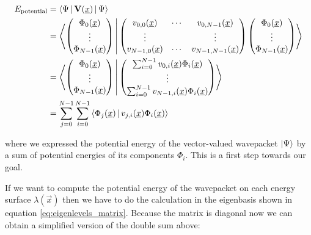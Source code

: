 \begin{align*}
  E_{\text{potential}}
  & = \Braket{\Psi | \mathbf{V}(\underline{x}) | \Psi} \\
  & = \Braket{
    \begin{pmatrix}
      \Phi_0(\underline{x}) \\
      \vdots \\
      \Phi_{N-1}(\underline{x}) \\
    \end{pmatrix}
    |
    \begin{pmatrix}
      v_{0,0}(\underline{x})   & \cdots & v_{0,N-1}(\underline{x}) \\
      \vdots             &        & \vdots \\
      v_{N-1,0}(\underline{x}) & \cdots & v_{N-1,N-1}(\underline{x})
    \end{pmatrix}
    \begin{pmatrix}
      \Phi_0(\underline{x}) \\
      \vdots \\
      \Phi_{N-1}(\underline{x}) \\
    \end{pmatrix}
    } \\
  & = \Braket{
    \begin{pmatrix}
      \Phi_0(\underline{x}) \\
      \vdots \\
      \Phi_{N-1}(\underline{x}) \\
    \end{pmatrix}
    |
    \begin{pmatrix}
      \sum_{i=0}^{N-1} v_{0,i}(\underline{x}) \Phi_i(\underline{x}) \\
      \vdots \\
      \sum_{i=0}^{N-1} v_{N-1,i}(\underline{x}) \Phi_i(\underline{x}) \\
    \end{pmatrix}
    } \\
  & = \sum_{j=0}^{N-1} \sum_{i=0}^{N-1} \Braket{ \Phi_j(\underline{x}) | v_{j,i}(\underline{x}) \Phi_i(\underline{x}) }
\end{align*}

where we expressed the potential energy of the vector-valued wavepacket $\Ket{\Psi}$ by a sum
of potential energies of its components $\Phi_i$. This is a first step towards our goal.

If we want to compute the potential energy of the wavepacket on each energy surface $\lambda(\vec{x})$
then we have to do the calculation in the eigenbasis shown in equation \eqref{eq:eigenlevels_matrix}.
Because the matrix is diagonal now we can obtain a simplified version of the double sum above:

